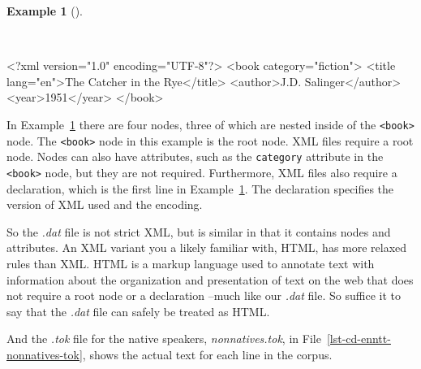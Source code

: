 \documentclass[
  letterpaper,
  DIV=11,
  numbers=noendperiod]{scrreprt}
\newenvironment{Shaded}{\begin{snugshade}}{\end{snugshade}}
\newcommand{\FunctionTok}[1]{\textcolor[rgb]{0.00,0.00,0.00}{#1}}
\newcommand{\KeywordTok}[1]{\textcolor[rgb]{0.00,0.00,0.00}{#1}}
\newcommand{\NormalTok}[1]{\textcolor[rgb]{0.00,0.00,0.00}{#1}}
\newcommand{\OtherTok}[1]{\textcolor[rgb]{0.00,0.00,0.00}{#1}}
\newcommand{\StringTok}[1]{\textcolor[rgb]{0.00,0.00,0.00}{#1}}
\theoremstyle{definition}
\newtheorem{example}{Example}[chapter]
\theoremstyle{remark}
\begin{document}
\begin{example}[]\protect\hypertarget{exm-cd-xml}{}\label{exm-cd-xml}

~

\begin{Shaded}
\begin{Highlighting}[]
\FunctionTok{\textless{}?xml}\OtherTok{ version=}\StringTok{"1.0"}\OtherTok{ encoding=}\StringTok{"UTF{-}8"}\FunctionTok{?\textgreater{}}
\NormalTok{\textless{}}\KeywordTok{book}\OtherTok{ category=}\StringTok{"fiction"}\NormalTok{\textgreater{}}
\NormalTok{  \textless{}}\KeywordTok{title}\OtherTok{ lang=}\StringTok{"en"}\NormalTok{\textgreater{}The Catcher in the Rye\textless{}/}\KeywordTok{title}\NormalTok{\textgreater{}}
\NormalTok{  \textless{}}\KeywordTok{author}\NormalTok{\textgreater{}J.D. Salinger\textless{}/}\KeywordTok{author}\NormalTok{\textgreater{}}
\NormalTok{  \textless{}}\KeywordTok{year}\NormalTok{\textgreater{}1951\textless{}/}\KeywordTok{year}\NormalTok{\textgreater{}}
\NormalTok{\textless{}/}\KeywordTok{book}\NormalTok{\textgreater{}}
\end{Highlighting}
\end{Shaded}

\end{example}

In Example~\ref{exm-cd-xml} there are four nodes, three of which are
nested inside of the \texttt{\textless{}book\textgreater{}} node. The
\texttt{\textless{}book\textgreater{}} node in this example is the root
node. XML files require a root node. Nodes can also have attributes,
such as the \texttt{category} attribute in the
\texttt{\textless{}book\textgreater{}} node, but they are not required.
Furthermore, XML files also require a declaration, which is the first
line in Example~\ref{exm-cd-xml}. The declaration specifies the version
of XML used and the encoding.

So the \emph{.dat} file is not strict XML, but is similar in that it
contains nodes and attributes. An XML variant you a likely familiar
with, HTML, has more relaxed rules than XML. HTML is a markup language
used to annotate text with information about the organization and
presentation of text on the web that does not require a root node or a
declaration --much like our \emph{.dat} file. So suffice it to say that
the \emph{.dat} file can safely be treated as HTML.

And the \emph{.tok} file for the native speakers, \emph{nonnatives.tok},
in File~\ref{lst-cd-enntt-nonnatives-tok}, shows the actual text for
each line in the corpus.
\end{document}

